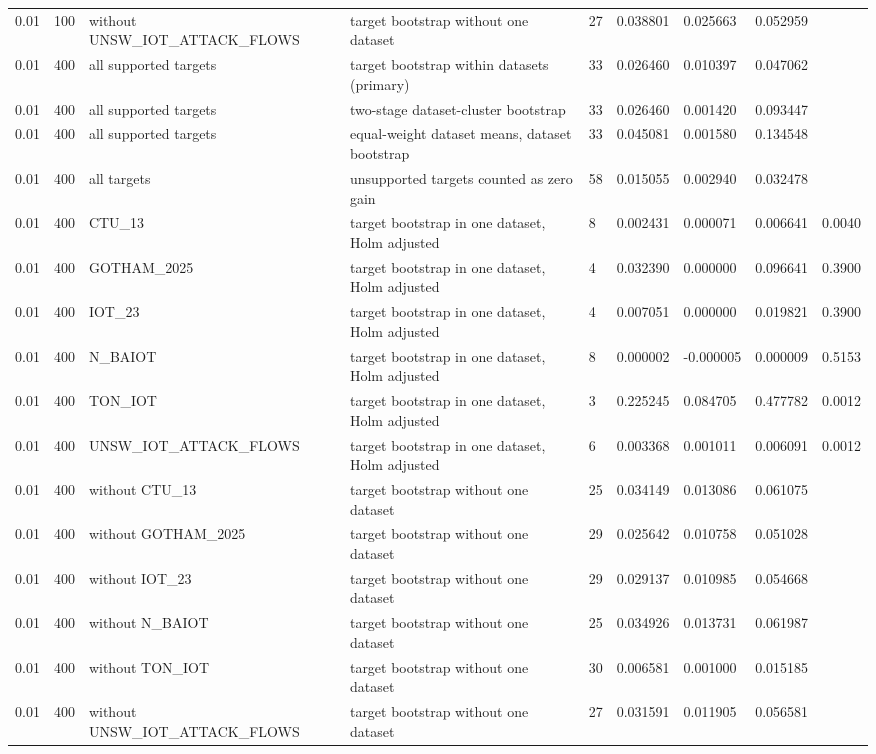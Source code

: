 \begin{tabular}{lllllllll}
0.01 & 100 & without UNSW\_IOT\_ATTACK\_FLOWS & target bootstrap without one dataset & 27 & 0.038801 & 0.025663 & 0.052959 &  \\
0.01 & 400 & all supported targets & target bootstrap within datasets (primary) & 33 & 0.026460 & 0.010397 & 0.047062 &  \\
0.01 & 400 & all supported targets & two-stage dataset-cluster bootstrap & 33 & 0.026460 & 0.001420 & 0.093447 &  \\
0.01 & 400 & all supported targets & equal-weight dataset means, dataset bootstrap & 33 & 0.045081 & 0.001580 & 0.134548 &  \\
0.01 & 400 & all targets & unsupported targets counted as zero gain & 58 & 0.015055 & 0.002940 & 0.032478 &  \\
0.01 & 400 & CTU\_13 & target bootstrap in one dataset, Holm adjusted & 8 & 0.002431 & 0.000071 & 0.006641 & 0.0040 \\
0.01 & 400 & GOTHAM\_2025 & target bootstrap in one dataset, Holm adjusted & 4 & 0.032390 & 0.000000 & 0.096641 & 0.3900 \\
0.01 & 400 & IOT\_23 & target bootstrap in one dataset, Holm adjusted & 4 & 0.007051 & 0.000000 & 0.019821 & 0.3900 \\
0.01 & 400 & N\_BAIOT & target bootstrap in one dataset, Holm adjusted & 8 & 0.000002 & -0.000005 & 0.000009 & 0.5153 \\
0.01 & 400 & TON\_IOT & target bootstrap in one dataset, Holm adjusted & 3 & 0.225245 & 0.084705 & 0.477782 & 0.0012 \\
0.01 & 400 & UNSW\_IOT\_ATTACK\_FLOWS & target bootstrap in one dataset, Holm adjusted & 6 & 0.003368 & 0.001011 & 0.006091 & 0.0012 \\
0.01 & 400 & without CTU\_13 & target bootstrap without one dataset & 25 & 0.034149 & 0.013086 & 0.061075 &  \\
0.01 & 400 & without GOTHAM\_2025 & target bootstrap without one dataset & 29 & 0.025642 & 0.010758 & 0.051028 &  \\
0.01 & 400 & without IOT\_23 & target bootstrap without one dataset & 29 & 0.029137 & 0.010985 & 0.054668 &  \\
0.01 & 400 & without N\_BAIOT & target bootstrap without one dataset & 25 & 0.034926 & 0.013731 & 0.061987 &  \\
0.01 & 400 & without TON\_IOT & target bootstrap without one dataset & 30 & 0.006581 & 0.001000 & 0.015185 &  \\
0.01 & 400 & without UNSW\_IOT\_ATTACK\_FLOWS & target bootstrap without one dataset & 27 & 0.031591 & 0.011905 & 0.056581 &  \\

\end{tabular}
